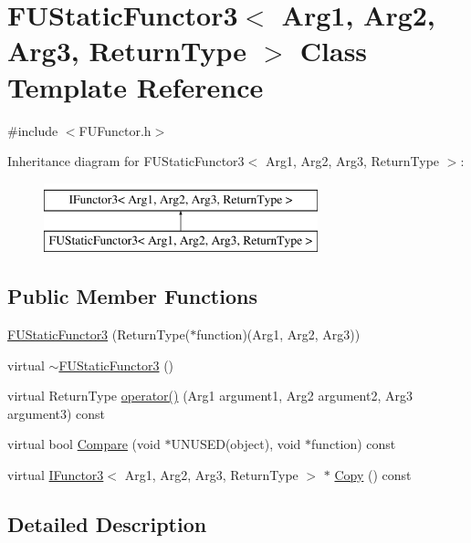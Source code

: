 \hypertarget{classFUStaticFunctor3}{
\section{FUStaticFunctor3$<$ Arg1, Arg2, Arg3, ReturnType $>$ Class Template Reference}
\label{classFUStaticFunctor3}
}


{\ttfamily \#include $<$FUFunctor.h$>$}

Inheritance diagram for FUStaticFunctor3$<$ Arg1, Arg2, Arg3, ReturnType $>$:\begin{figure}[H]
\begin{center}
\leavevmode
\includegraphics[height=2.000000cm]{classFUStaticFunctor3}
\end{center}
\end{figure}
\subsection*{Public Member Functions}
\begin{DoxyCompactItemize}
\item 
\hyperlink{classFUStaticFunctor3_ab9a6533ce2635625ef755f7e21ba617a}{FUStaticFunctor3} (ReturnType($\ast$function)(Arg1, Arg2, Arg3))
\item 
virtual \hyperlink{classFUStaticFunctor3_adb470a24022c8bc9cd984af00904ff91}{$\sim$FUStaticFunctor3} ()
\item 
virtual ReturnType \hyperlink{classFUStaticFunctor3_a9dfd76b69ced5dc97981b85b1741aaf7}{operator()} (Arg1 argument1, Arg2 argument2, Arg3 argument3) const 
\item 
virtual bool \hyperlink{classFUStaticFunctor3_ae7aa887d6b3970a510a8ce4c43061184}{Compare} (void $\ast$UNUSED(object), void $\ast$function) const 
\item 
virtual \hyperlink{classIFunctor3}{IFunctor3}$<$ Arg1, Arg2, Arg3, ReturnType $>$ $\ast$ \hyperlink{classFUStaticFunctor3_a5af659e916e966bfb80cd7def0c574b6}{Copy} () const 
\end{DoxyCompactItemize}


\subsection{Detailed Description}
